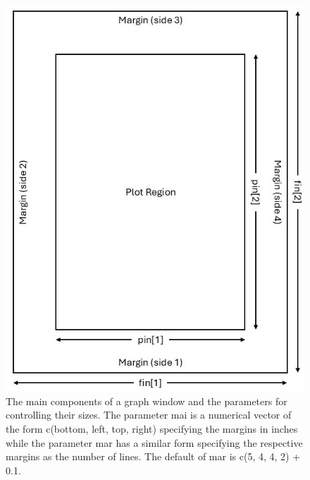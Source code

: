 \documentclass[
]{book}
\begin{document}
\begin{figure}
\includegraphics[width=1\linewidth]{pics/figMargins} \caption{The main components of a graph window and the parameters for controlling their sizes.  The parameter mai is a numerical vector of the form c(bottom, left, top, right) specifying the margins in inches while the parameter mar has a similar form specifying the respective margins as the number of lines. The default of mar is c(5, 4, 4, 2) + 0.1.}\label{fig:figRegion}
\end{figure}
\end{document}
